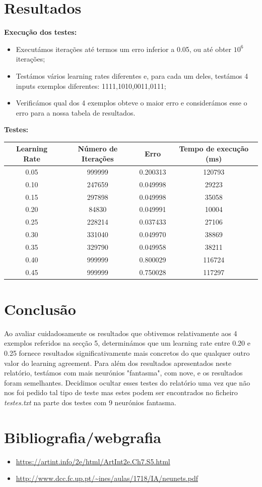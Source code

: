 \documentclass{article}
\begin{document}
\section{Resultados}
\textbf{Execução dos testes:}
\begin{itemize}
  \item[\textbullet]{Executámos iterações até termos um erro inferior a 0.05, ou até obter $10^6$ iterações;}
  \item[\textbullet]{Testámos vários learning rates diferentes e, para cada um deles, testámos 4 inputs exemplos diferentes: 1111,1010,0011,0111;}
  \item[\textbullet]{Verificámos qual dos 4 exemplos obteve o maior erro e considerámos esse o erro para a nossa tabela de resultados.}
\end{itemize}
\textbf{Testes:}
\begin{center}
\begin{tabular}{|c|c|c|c|}
  \hline
  \textbf{Learning Rate} & \textbf{Número de Iterações} & \textbf{Erro} & \textbf{Tempo de execução (ms)}\\
  \hline
  0.05 & 999999 & 0.200313 & 120793 \\
  \hline
  0.10 & 247659 & 0.049998 & 29223\\
  \hline
  0.15 & 297898 & 0.049998 & 35058 \\
  \hline
  0.20 & 84830 & 0.049991 & 10004 \\
  \hline
  0.25 & 228214 & 0.037433 & 27106\\
  \hline
  0.30 & 331040 & 0.049970 & 38869\\
  \hline
  0.35 & 329790 & 0.049958 & 38211\\
  \hline
  0.40 & 999999 & 0.800029 & 116724\\
  \hline
  0.45 & 999999 & 0.750028 & 117297\\
  \hline
\end{tabular}
\end{center}
\section{Conclusão}
\hspace{10mm}Ao avaliar cuidadosamente os resultados que obtivemos relativamente aos 4 exemplos referidos na secção 5, determinámos que um learning rate entre 0.20 e 0.25 fornece resultados significativamente mais concretos do que qualquer outro valor do learning agreement. Para além dos resultados apresentados neste relatório, testámos com mais neurónios "fantasma", com nove, e os resultados foram semelhantes. Decidimos ocultar esses testes do relatório uma vez que não nos foi pedido tal tipo de teste mas estes podem ser encontrados no ficheiro \textit{testes.txt} na parte dos testes com 9 neurónios fantasma.
\section{Bibliografia/webgrafia}
\begin{itemize}
  \item{\url{https://artint.info/2e/html/ArtInt2e.Ch7.S5.html}}
  \item{\url{http://www.dcc.fc.up.pt/~ines/aulas/1718/IA/neunets.pdf}}
\end{itemize}
\end{document}
